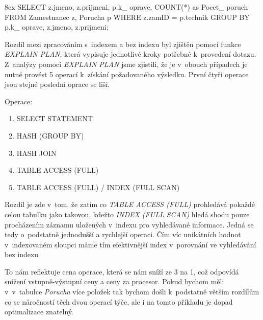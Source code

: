 \documentclass[11pt,a4paper,onecolumn]{article}
\begin{document}
\begingroup
\leftskip8ex
\rightskip\leftskip
{\ttfamily\noindent SELECT z.jmeno, z.prijmeni, p.k\_ oprave, COUNT(*) as Pocet\_ poruch  \newline FROM Zamestnanec z, Porucha p \newline WHERE z.zamID = p.technik \newline GROUP BY p.k\_ oprave, z.jmeno, z.prijmeni;}\par
\endgroup

Rozdíl mezi zpracováním s~indexem a bez indexu byl zjištěn pomocí funkce \textit{EXPLAIN PLAN}, která
vypisuje jednotlivé kroky potřebné k~provedení dotazu. Z~analýzy pomocí \textit{EXPLAIN PLAN} jsme zjistili, že je v~obouch případech je nutné provést 5 operací k~získání požadovaného výsledku. První čtyři operace jsou stejné poslední oprace se liší.

\bigskip
Operace:
\begin{enumerate}
\item SELECT STATEMENT
\item HASH (GROUP BY)     
\item HASH JOIN
\item TABLE ACCESS (FULL)
\item TABLE ACCESS (FULL) / INDEX (FULL SCAN)
\end{enumerate}

Rozdíl je zde v~tom, že zatím co \textit{TABLE ACCESS (FULL)} prohledává pokaždé celou tabulku jako takovou, kdežto  \textit{INDEX (FULL SCAN)} hledá shodu pouze procházením záznamu uložených v~indexu pro vyhledávané informace. Jedná se tedy o~podstatně jednodušší a rychlejší operaci. Čím víc unikátních hodnot v~indexovaném sloupci máme tím efektivnější index v~porovnání ve vyhledávání bez indexu

To nám reflektuje cena operace, která se nám sníží ze 3 na 1, což odpovídá snížení
vstupně-výstupní ceny a ceny za procesor. Pokud bychom měli v~v~tabulce \textit{Porucha} více
položek tak bychom došli k~podstatně větším rozdílům co se náročností těch dvou operací týče, ale
i na tomto příkladu je dopad optimalizace znatelný.\newpage
\end{document}
